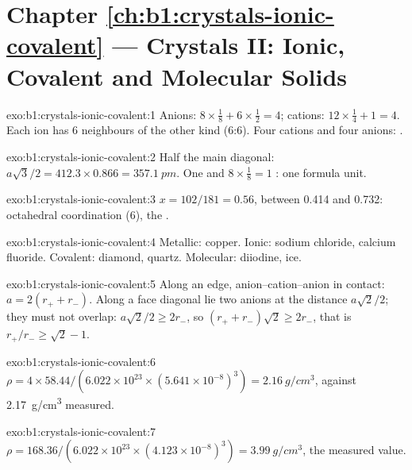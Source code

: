 \section*{Chapter \ref{ch:b1:crystals-ionic-covalent} --- Crystals II: Ionic, Covalent and Molecular Solids}

\begin{solution}{exo:b1:crystals-ionic-covalent:1}
Anions: $8 \times \frac18 + 6 \times \frac12 = 4$; cations: $12 \times
\frac14 + 1 = 4$. Each ion has 6 neighbours of the other kind (6:6). Four
cations and four anions: .
\end{solution}

\begin{solution}{exo:b1:crystals-ionic-covalent:2}
Half the main diagonal: $a\sqrt3/2 = 412.3 \times 0.866 = \qty{357.1}{pm}$.
One  and $8 \times \frac18 = 1$ : one formula unit.
\end{solution}

\begin{solution}{exo:b1:crystals-ionic-covalent:3}
$x = 102/181 = 0.56$, between 0.414 and 0.732: octahedral coordination
(6), the .
\end{solution}

\begin{solution}{exo:b1:crystals-ionic-covalent:4}
Metallic: copper. Ionic: sodium chloride, calcium fluoride. Covalent:
diamond, quartz. Molecular: diiodine, ice.
\end{solution}

\begin{solution}{exo:b1:crystals-ionic-covalent:5}
Along an edge, anion--cation--anion in contact: $a = 2(r_+ + r_-)$. Along
a face diagonal lie two anions at the distance $a\sqrt2/2$; they must not
overlap: $a\sqrt2/2 \ge 2r_-$, so $(r_+ + r_-)\sqrt2 \ge 2r_-$, that is
$r_+/r_- \ge \sqrt2 - 1$.
\end{solution}

\begin{solution}{exo:b1:crystals-ionic-covalent:6}
$\rho = 4 \times 58.44/(6.022 \times 10^{23} \times (5.641 \times
10^{-8})^3) = \qty{2.16}{g/cm^3}$, against \qty{2.17}{g/cm^3} measured.
\end{solution}

\begin{solution}{exo:b1:crystals-ionic-covalent:7}
$\rho = 168.36/(6.022 \times 10^{23} \times (4.123 \times 10^{-8})^3) =
\qty{3.99}{g/cm^3}$, the measured value.
\end{solution}

